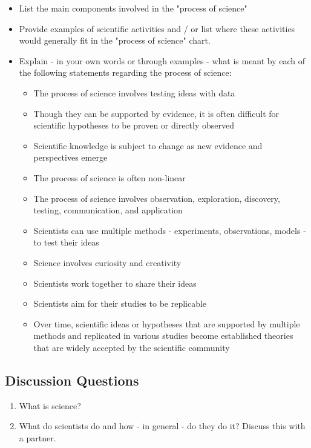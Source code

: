 \documentclass[
]{book}
\providecommand{\tightlist}{%
  \setlength{\itemsep}{0pt}\setlength{\parskip}{0pt}}
\begin{document}
\begin{itemize}
\tightlist
\item
  List the main components involved in the "process of science"
\item
  Provide examples of scientific activities and / or list where these activities would generally fit in the "process of science" chart.
\item
  Explain - in your own words or through examples - what is meant by each of the following statements regarding the process of science:

  \begin{itemize}
  \tightlist
  \item
    The process of science involves testing ideas with data
  \item
    Though they can be supported by evidence, it is often difficult for scientific hypotheses to be proven or directly observed
  \item
    Scientific knowledge is subject to change as new evidence and perspectives emerge
  \item
    The process of science is often non-linear
  \item
    The process of science involves observation, exploration, discovery, testing, communication, and application
  \item
    Scientists can use multiple methods - experiments, observations, models - to test their ideas
  \item
    Science involves curiosity and creativity
  \item
    Scientists work together to share their ideas
  \item
    Scientists aim for their studies to be replicable
  \item
    Over time, scientific ideas or hypotheses that are supported by multiple methods and replicated in various studies become established theories that are widely accepted by the scientific community
  \end{itemize}
\end{itemize}

\hypertarget{discussion-questions}{%
\subsection*{Discussion Questions}\label{discussion-questions}}

\begin{enumerate}
\def\labelenumi{\arabic{enumi}.}
\tightlist
\item
  What is science?
\item
  What do scientists do and how - in general - do they do it? Discuss this with a partner.
\end{enumerate}
\end{document}
